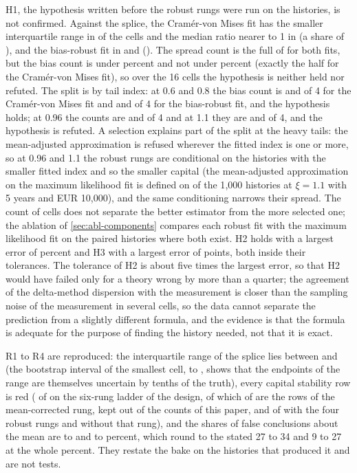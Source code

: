 H1, the hypothesis written before the robust rungs were run on the histories, is not confirmed. Against the splice, the Cram\'er-von Mises fit has the smaller interquartile range in \rhCvmSpread{} of the \rhCells{} cells and the median ratio nearer to 1 in \rhCvmBias{} (a share of \rhCvmBiasShare{}), and the bias-robust fit in \rhObreSpread{} and \rhObreBias{} (\rhObreBiasShare{}). The spread count is the full \rhCells{} of \rhCells{} for both fits, but the bias count is under \rhHolds{} percent and not under \rhRefuted{} percent (exactly the half for the Cram\'er-von Mises fit), so over the 16 cells the hypothesis is neither held nor refuted. The split is by tail index: at 0.6 and 0.8 the bias count is \rhCvmBiasA{} and \rhCvmBiasB{} of 4 for the Cram\'er-von Mises fit and \rhObreBiasA{} and \rhObreBiasB{} of 4 for the bias-robust fit, and the hypothesis holds; at 0.96 the counts are \rhCvmBiasC{} and \rhObreBiasC{} of 4 and at 1.1 they are \rhCvmBiasD{} and \rhObreBiasD{} of 4, and the hypothesis is refuted. A selection explains part of the split at the heavy tails: the mean-adjusted approximation is refused wherever the fitted index is one or more, so at 0.96 and 1.1 the robust rungs are conditional on the histories with the smaller fitted index and so the smaller capital (the mean-adjusted approximation on the maximum likelihood fit is defined on \cMaDFaNdef{} of the 1{,}000 histories at $\xi=1.1$ with 5 years and EUR 10,000), and the same conditioning narrows their spread. The count of cells does not separate the better estimator from the more selected one; the ablation of \cref{sec:abl-components} compares each robust fit with the maximum likelihood fit on the paired histories where both exist.
H2 holds with a largest error of \thSdMaxErr{} percent and H3 with a largest error of \thShareMaxErr{} points, both inside their tolerances. The tolerance of H2 is about five times the largest error, so that H2 would have failed only for a theory wrong by more than a quarter; the agreement of the delta-method dispersion with the measurement is closer than the sampling noise of the measurement in several cells, so the data cannot separate the prediction from a slightly different formula, and the evidence is that the formula is adequate for the purpose of finding the history needed, not that it is exact.

R1 to R4 are reproduced: the interquartile range of the splice lies between \spIqrMin{} and \spIqrMax{} (the bootstrap interval of the smallest cell, \spMinLo{} to \spMinHi{}, shows that the endpoints of the range are themselves uncertain by tenths of the truth), every capital stability row is red (\redSix{} of \rowsSix{} on the six-rung ladder of the design, of which \redMc{} of \rowsMc{} are the rows of the mean-corrected rung, kept out of the counts of this paper, and \redTotal{} of \rowsTotal{} with the four robust rungs and without that rung), and the shares of false conclusions about the mean are \infLo{} to \infHi{} and \finLo{} to \finHi{} percent, which round to the stated 27 to 34 and 9 to 27 at the whole percent. They restate the bake on the histories that produced it and are not tests.


